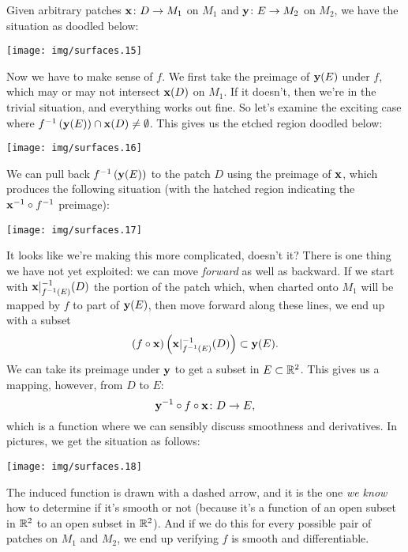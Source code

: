 Given arbitrary patches $\mathbf{x}\colon D\to M_{1}$ on $M_{1}$
and $\mathbf{y}\colon E\to M_{2}$ on $M_{2}$, we have the situation as
doodled below:
\begin{center}
  \texttt{[image: img/surfaces.15]}
\end{center}
Now we have to make sense of $f$. We first take the preimage of
$\mathbf{y}(E)$ under $f$, which may or may not intersect $\mathbf{x}(D)$
on $M_{1}$. If it doesn't, then we're in the trivial situation, and
everything works out fine. So let's examine the exciting case where
$f^{-1}\left(\mathbf{y}(E)\right)\cap\mathbf{x}(D)\neq\emptyset$. This
gives us the etched region doodled below:
\begin{center}
  \texttt{[image: img/surfaces.16]}
\end{center}
We can pull back $f^{-1}\left(\mathbf{y}(E)\right)$ to the patch $D$
using the preimage of $\mathbf{x}$, which produces the following
situation (with the hatched region indicating the $\mathbf{x}^{-1}\circ f^{-1}$
preimage):
\begin{center}
  \texttt{[image: img/surfaces.17]}
\end{center}
It looks like we're making this more complicated, doesn't it? There is
one thing we have not yet exploited: we can move \emph{forward} as well
as backward. If we start with $\mathbf{x}|_{f^{-1}(E)}^{-1}(D)$ the
portion of the patch which, when charted onto $M_{1}$ will be mapped by
$f$ to part of $\mathbf{y}(E)$, then move forward along these lines, we
end up with a subset
\begin{equation}
(f\circ\mathbf{x})\left(\mathbf{x}|_{f^{-1}(E)}^{-1}(D)\right)\subset\mathbf{y}(E).
\end{equation}
We can take its preimage under $\mathbf{y}$ to get a subset in
$E\subset\mathbb{R}^{2}$. This gives us a mapping, however, from $D$ to $E$:
\begin{equation}
\mathbf{y}^{-1}\circ f\circ\mathbf{x}\colon D\to E,
\end{equation}
which is a function where we can sensibly discuss smoothness and
derivatives. In pictures, we get the situation as follows:
\begin{center}
  \texttt{[image: img/surfaces.18]}
\end{center}
The induced function is drawn with a dashed arrow, and it is the one
\emph{we know} how to determine if it's smooth or not (because it's a
function of an open subset in $\mathbb{R}^{2}$ to an open subset in $\mathbb{R}^{2}$).
And if we do this for every possible pair of patches on $M_{1}$ and
$M_{2}$, we end up verifying $f$ is smooth and differentiable.

